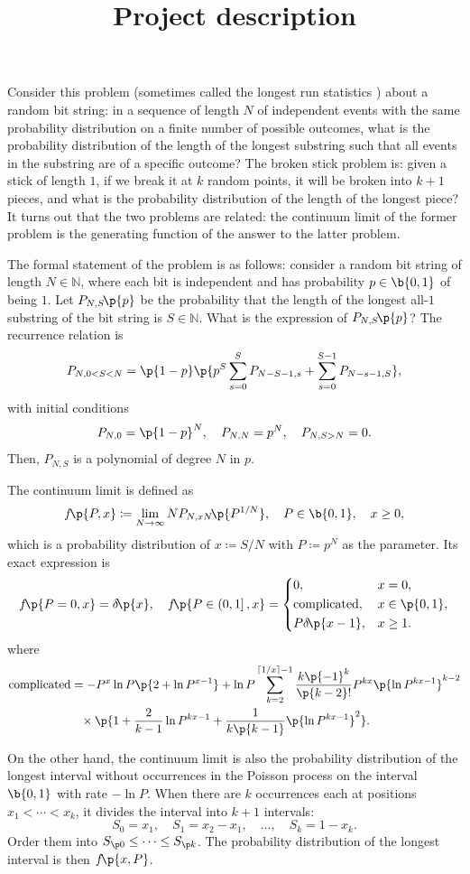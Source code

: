 \documentclass{article}
\title{Project description}
\newcommand{\mbb}[1]{\mathbb{#1}}
\newcommand{\bN}{\mbb{N}}
\newcommand{\dlt}{\delta}
\newcommand{\ceq}{\coloneqq}
\newcommand{\fr}{\frac}
\newcommand{\fc}[2]{#1\mathchoice{\!}{\!}{}{}\p{#2}} %
\newcommand\ceil[1]{\left\lceil#1\right\rceil}
\begin{document}
Consider this problem (sometimes called the longest run statistics \cite{makri})
about a random bit string:
in a sequence of length $N$ of independent events with the same probability distribution
on a finite number of possible outcomes,
what is the probability distribution of the length of the longest substring such that
all events in the substring are of a specific outcome?
The broken stick problem is:
given a stick of length $1$,
if we break it at $k$ random points, it will be broken into $k+1$ pieces,
and what is the probability distribution of the length of the longest piece?
It turns out that the two problems are related:
the continuum limit of the former problem is the generating function of the answer to the latter problem.

The formal statement of the problem is as follows:
consider a random bit string of length $N\in\bN$, where each bit is independent and
has probability $p\in\b{0,1}$ of being $1$.
Let $\fc{P_{N,S}}p$ be the probability that the length of the longest all-$1$ substring
of the bit string is $S\in\bN$.
What is the expression of $\fc{P_{N,S}}p$?
The recurrence relation is
\[P_{N,0<S<N}=\p{1-p}\p{p^S\sum_{s=0}^SP_{N-S-1,s}+\sum_{s=0}^{S-1}P_{N-s-1,S}},\]
with initial conditions
\[P_{N,0}=\p{1-p}^N,\quad P_{N,N}=p^N,\quad P_{N,S>N}=0.\]
Then, $P_{N,S}$ is a polynomial of degree $N$ in $p$.

The continuum limit is defined as
\[\fc f{P,x}\ceq\lim_{N\to\infty}N\fc{P_{N,xN}}{P^{1/N}},\quad P\in\b{0,1},\quad x\ge0,\]
which is a probability distribution of $x\ceq S/N$ with $P\ceq p^N$ as the parameter.
Its exact expression is
\[\fc f{P=0,x}=\fc\dlt x,\quad\fc f{P\in\left(0,1\right],x}=\begin{dcases}
	0,&x=0,\\\text{complicated},&x\in\p{0,1},\\P\fc\dlt{x-1},&x\ge1.
\end{dcases}\]
where
\begin{align*}
	\text{complicated}&=-P^x\ln P\p{2+\ln P^{x-1}}
	+\ln P\sum_{k=2}^{\ceil{1/x}-1}\fr{k\p{-1}^k}{\p{k-2}!}P^{kx}\p{\ln P^{kx-1}}^{k-2}\\
	&\phantom{=}{}\times\p{1+\fr2{k-1}\ln P^{kx-1}+\fr1{k\p{k-1}}\p{\ln P^{kx-1}}^2}.
\end{align*}

On the other hand, the continuum limit is also the probability distribution of the longest interval
without occurrences in the Poisson process on the interval $\b{0,1}$ with rate $-\ln P$.
When there are $k$ occurrences each at positions $x_1<\cdots<x_k$, it divides the interval into
$k+1$ intervals:
\[S_0=x_1,\quad S_1=x_2-x_1,\quad\ldots,\quad S_k=1-x_k.\]
Order them into $S_{\p0}\le\cdots\le S_{\p k}$.
The probability distribution of the longest interval is then $\fc f{x,P}$.
\end{document}
